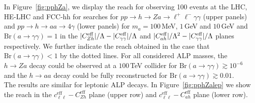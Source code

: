 In Figure~\ref{fig:pphZa}, we display the reach for observing 100 events at the LHC, HE-LHC and FCC-hh for searches for $pp\to h \to Za\to \ell^+\ell^-\gamma\gamma$ (upper panels) and  $pp\to h \to aa\to 4 \gamma$ (lower panels) for $m_a= 100\,$MeV, $1\,$GeV and $10\,$GeV and $\text{Br}(a\to \gamma\gamma)=1$ in the $|C_{Zh}^{\rm eff}|/\Lambda - |C_{\gamma\gamma}^{\rm eff}|/\Lambda$ and $|C_{ah}^{\rm eff}|/\Lambda^2 - |C_{\gamma\gamma}^{\rm eff}|/\Lambda$ planes respectively. We further indicate the reach obtained in the case that $\text{Br}(a\to \gamma\gamma)<1$ by the dotted lines. 
For all considered ALP masses, the $h\to Z a$ decay could be observed at a $100\,$TeV collider for $\text{Br}(a\to \gamma\gamma)\gtrsim 10^{-6}$ and the $h\to a a$ decay could be fully reconstructed for $\text{Br}(a\to \gamma\gamma)\gtrsim 0.01$. \\
The results are similar for leptonic ALP decays. In Figure~\ref{fig:pphZalep} we show the reach in the $c_{\ell\ell}^\text{eff} - C_{Zh}^\text{eff}$ plane (upper row) and  $c_{\ell\ell}^\text{eff} - C_{ah}^\text{eff}$ plane (lower row). 
